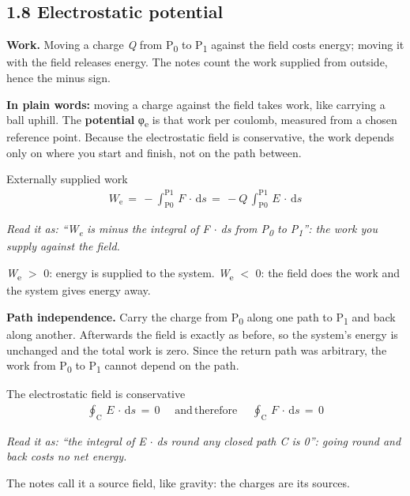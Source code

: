 \documentclass[11pt]{article}
\begin{document}
\begin{keepsection}
\section{1.8 Electrostatic potential}

\textbf{Work.} Moving a charge \textit{Q} from P\textsubscript{0} to P\textsubscript{1} against the field costs energy; moving it with the field releases energy. The notes count the work supplied from outside, hence the minus sign.

\begin{plainbox}\textbf{In plain words:} moving a charge against the field takes work, like carrying a ball uphill. The \textbf{potential} φ\textsubscript{e} is that work per coulomb, measured from a chosen reference point. Because the electrostatic field is conservative, the work depends only on where you start and finish, not on the path between.\end{plainbox}

\begin{equationcard}{Externally supplied work}
\[ \begin{gathered} {W}_{\mathrm{e}}\, =\, -\int_{\mathrm{P}0}^{\mathrm{P}1} \, {F}\, \cdot \, \mathrm{d}{s}\, =\, -{Q}\, \int_{\mathrm{P}0}^{\mathrm{P}1} \, {E}\, \cdot \, \mathrm{d}{s} \end{gathered} \]
{\small \emph{Read it as: “W\textsubscript{e} is minus the integral of F \ensuremath{\cdot} ds from P\textsubscript{0} to P\textsubscript{1}”: the work you supply against the field.}\par \textit{W}\textsubscript{e} \ensuremath{>} 0: energy is supplied to the system. \textit{W}\textsubscript{e} \ensuremath{<} 0: the field does the work and the system gives energy away.}
\end{equationcard}

\textbf{Path independence.} Carry the charge from P\textsubscript{0} along one path to P\textsubscript{1} and back along another. Afterwards the field is exactly as before, so the system’s energy is unchanged and the total work is zero. Since the return path was arbitrary, the work from P\textsubscript{0} to P\textsubscript{1} cannot depend on the path.

\begin{equationcard}{The electrostatic field is conservative}
\[ \begin{gathered} \oint_{\mathrm{C}} \, {E}\, \cdot \, \mathrm{d}{s}\, =\, 0\, \quad \, \text{and}\, \text{therefore}\, \quad \, \oint_{\mathrm{C}} \, {F}\, \cdot \, \mathrm{d}{s}\, =\, 0 \end{gathered} \]
{\small \emph{Read it as: “the integral of E \ensuremath{\cdot} ds round any closed path C is 0”: going round and back costs no net energy.}\par The notes call it a source field, like gravity: the charges are its sources.}
\end{equationcard}


\end{keepsection}
\end{document}
